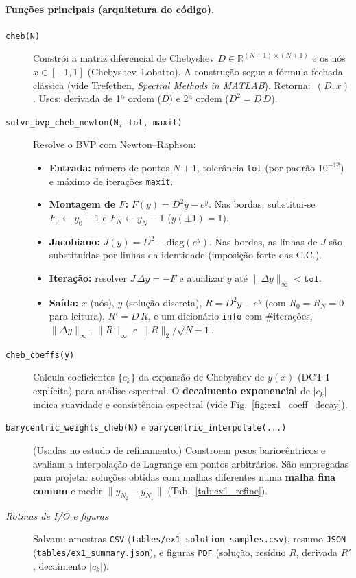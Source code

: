 \documentclass[12pt,a4paper]{article}
\begin{document}
\paragraph{Funções principais (arquitetura do código).}
\begin{description}
  \item[\texttt{cheb(N)}] 
  Constrói a matriz diferencial de Chebyshev \(D\in\mathbb{R}^{(N+1)\times(N+1)}\) e os nós \(x\in[-1,1]\) (Chebyshev–Lobatto).
  A construção segue a fórmula fechada clássica (vide Trefethen, \textit{Spectral Methods in MATLAB}). 
  Retorna: \(\,(D, x)\). Usos: derivada de 1ª ordem (\(D\)) e 2ª ordem (\(D^2=D\,D\)).

  \item[\texttt{solve\_bvp\_cheb\_newton(N, tol, maxit)}]
  Resolve o BVP com Newton–Raphson:
  \begin{itemize}
    \item \textbf{Entrada:} número de pontos \(N+1\), tolerância \texttt{tol} (por padrão \(10^{-12}\)) e máximo de iterações \texttt{maxit}.
    \item \textbf{Montagem de \(F\):} \(F(y)=D^2y-e^{y}\). Nas bordas, substitui-se \(F_0 \leftarrow y_0-1\) e \(F_N \leftarrow y_N-1\) (\(y(\pm1)=1\)).
    \item \textbf{Jacobiano:} \(J(y)=D^2-\mathrm{diag}(e^{y})\). Nas bordas, as linhas de \(J\) são substituídas por linhas da identidade (imposição forte das C.C.).
    \item \textbf{Iteração:} resolver \(J\,\Delta y=-F\) e atualizar \(y\) até \(\|\Delta y\|_\infty < \texttt{tol}\).
    \item \textbf{Saída:} \(x\) (nós), \(y\) (solução discreta), \(R=D^2y-e^{y}\) (com \(R_0=R_N=0\) para leitura), \(R'=D\,R\), e um dicionário \texttt{info} com \(\#\)iterações, \(\|\Delta y\|_\infty\), \(\|R\|_\infty\) e \(\|R\|_2/\sqrt{N-1}\).
  \end{itemize}

  \item[\texttt{cheb\_coeffs(y)}]
  Calcula coeficientes \(\{c_k\}\) da expansão de Chebyshev de \(y(x)\) (DCT-I explícita) para análise espectral.
  O \textbf{decaimento exponencial} de \(|c_k|\) indica suavidade e consistência espectral (vide Fig.~\ref{fig:ex1_coeff_decay}).

  \item[\texttt{barycentric\_weights\_cheb(N)} e \texttt{barycentric\_interpolate(...)}]
  (Usadas no estudo de refinamento.) Constroem pesos bariocêntricos e avaliam a interpolação de Lagrange em pontos arbitrários.
  São empregadas para projetar soluções obtidas com malhas diferentes numa \textbf{malha fina comum} e medir \(\|y_{N_2}-y_{N_1}\|\) (Tab.~\ref{tab:ex1_refine}).

  \item[\textit{Rotinas de I/O e figuras}]
  Salvam: amostras \texttt{CSV} (\texttt{tables/ex1\_solution\_samples.csv}), resumo \texttt{JSON} (\texttt{tables/ex1\_summary.json}), 
  e figuras \texttt{PDF} (solução, resíduo \(R\), derivada \(R'\), decaimento \(|c_k|\)).
\end{description}
\end{document}

